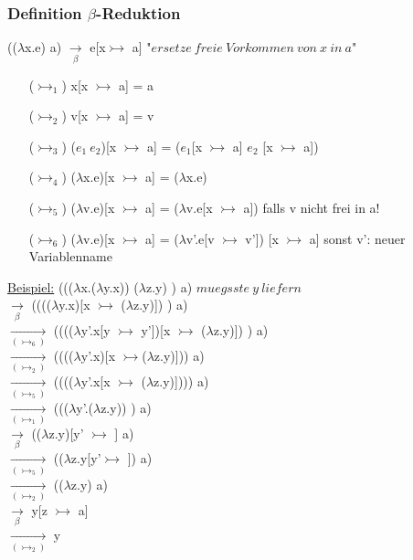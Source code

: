 \documentclass[a4paper,12pt]{article}
\begin{document}
\subsubsection{Definition $\beta$-Reduktion}
(($\lambda$x.e) a) $\underset{\beta}{\rightarrow}$ e[x$\rightarrowtail$ a] "$ersetze\ freie\ Vorkommen\ von\ x\ in\ a$"\\
\begin{itemize}
\item[($\rightarrowtail_1$)] x[x $\rightarrowtail$ a] = a
\item[($\rightarrowtail_2$)] v[x $\rightarrowtail$ a] = v
\item[($\rightarrowtail_3$)] ($e_1\ e_2$)[x $\rightarrowtail$ a] = ($e_1$[x $\rightarrowtail$ a] $e_2$ [x $\rightarrowtail$ a])
\item[($\rightarrowtail_4$)] ($\lambda$x.e)[x $\rightarrowtail$ a] = ($\lambda$x.e)
\item[($\rightarrowtail_5$)] %
							($\lambda$v.e)[x $\rightarrowtail$ a] = ($\lambda$v.e[x $\rightarrowtail$ a]) falls v nicht frei in a!
\item[($\rightarrowtail_6$)] ($\lambda$v.e)[x $\rightarrowtail$ a] = ($\lambda$v'.e[v $\rightarrowtail$ v']) [x $\rightarrowtail$ a] sonst v': neuer Variablenname
\end{itemize}
\uline{Beispiel:}
((($\lambda$x.($\lambda$y.x)) ($\lambda$z.y) \maltese) a) $muegsste\ y\ liefern$\\
$\underset{\beta}{\rightarrow}$ (((($\lambda$y.x)[x $\rightarrowtail$ ($\lambda$z.y)]) \maltese) a)\\
$\underset{(\rightarrowtail_6)}{\rightarrow}$ (((($\lambda$y'.x[y $\rightarrowtail$ y'])[x $\rightarrowtail$ ($\lambda$z.y)]) \maltese) a)\\
$\underset{(\rightarrowtail_2)}{\rightarrow}$ (((($\lambda$y'.x)[x $\rightarrowtail$($\lambda$z.y)])\maltese) a)\\
$\underset{(\rightarrowtail_5)}{\rightarrow}$ (((($\lambda$y'.x[x $\rightarrowtail$ ($\lambda$z.y)]))\maltese) a)\\
$\underset{(\rightarrowtail_1)}{\rightarrow}$ ((($\lambda$y'.($\lambda$z.y)) \maltese) a)\\
$\underset{\beta}{\rightarrow}$ (($\lambda$z.y)[y' $\rightarrowtail$ \maltese] a)\\
$\underset{(\rightarrowtail_5)}{\rightarrow}$ (($\lambda$z.y[y'$\rightarrowtail$ \maltese]) a)\\
$\underset{(\rightarrowtail_2)}{\rightarrow}$ (($\lambda$z.y) a)\\
$\underset{\beta}{\rightarrow}$ y[z $\rightarrowtail$ a]\\
$\underset{(\rightarrowtail_2)}{\rightarrow}$ y
\end{document}
